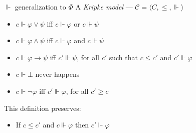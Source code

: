\documentclass[sans]{beamer}
\begin{document}
\begin{frame}{$\Vdash$ generalization to $\Phi$}
  A \emph{Kripke model} --- $\mathcal{C} = \langle C,\leq,{\Vdash} \rangle$
  \begin{itemize}
    \item $c \Vdash \varphi \vee \psi$ iff $c \Vdash \varphi$ or $c \Vdash \psi$
    \item $c \Vdash \varphi \wedge \psi$ iff $c \Vdash \varphi$ and $c \Vdash \psi$
    \item $c \Vdash \varphi \to \psi$ iff $c' \Vdash \psi$, for all $c'$ such that $c \leq c'$ and $c' \Vdash \varphi$
    \item $c \Vdash \bot$ never happens

    \vfill
    \pause
    \item $c \Vdash \lnot \varphi$ iff $c' \Vdash \varphi$, for all $c' \geq c$
  \end{itemize}

  \pause
  \vfill
  This definition preserves:
  \begin{itemize}
      \item If $c \leq c'$ and $c \Vdash \varphi$ then $c' \Vdash \varphi$
  \end{itemize}
\end{frame}
\end{document}

